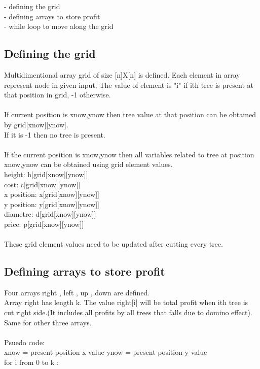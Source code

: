 \documentclass[12pt]{article}
\begin{document}
- defining the grid\\ %

- defining arrays to store profit\\ %

- while loop to move along the grid


\subsection{Defining the grid}
Multidimentional array grid of size [n]X[n] is defined. Each element in array represent node in given input. The value of element is "i" if ith tree is present at that position in grid, -1 otherwise.\\ \\
If current position is xnow,ynow then tree value at that position can be obtained by grid[xnow][ynow].\\
If it is -1 then no tree is present.\\ \\
If the current position is xnow,ynow then all variables related to tree at position xnow,ynow can be obtained using grid element values.\\
height: h[grid[xnow][ynow]]\\
cost:   c[grid[xnow][ynow]]\\
x position:      x[grid[xnow][ynow]]\\
y position:      y[grid[xnow][ynow]]\\
diametre:   d[grid[xnow][ynow]]\\
price:      p[grid[xnow][ynow]]\\ \\
These grid element values need to be updated after cutting every tree.\\

\subsection{Defining arrays to store profit}
Four arrays right , left , up , down are defined.\\
Array right has length k. The value right[i] will be total profit when ith tree is cut right side.(It includes all profits by all trees that falls due to domino effect). Same for other three arrays.\\
\\
Psuedo code:\\
xnow = present position x value
ynow = present position y value
\\
for i from 0 to k :\\
\end{document}
